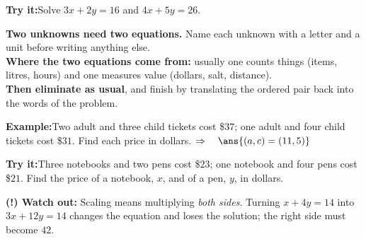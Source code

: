 \documentclass[12pt]{article}
\begin{document}
\begin{tryitbox}
\textbf{Try it:}\quad Solve $3x + 2y = 16$ and $4x + 5y = 26$.\\[2pt]
\end{tryitbox}


\begin{formulabox}
\textbf{Two unknowns need two equations.} Name each unknown with a letter and a
unit before writing anything else.\\[3pt]
\textbf{Where the two equations come from:} usually one counts things (items,
litres, hours) and one measures value (dollars, salt, distance).\\[3pt]
\textbf{Then eliminate as usual}, and finish by translating the ordered pair back
into the words of the problem.
\end{formulabox}

\begin{examplebox}
\textbf{Example:}\quad Two adult and three child tickets cost \$$37$; one adult
and four child tickets cost \$$31$. Find each price in dollars.
$\Rightarrow\quad \ans{(a, c) = (11, 5)}$
\end{examplebox}

\begin{tryitbox}
\textbf{Try it:}\quad Three notebooks and two pens cost \$$23$; one notebook and
four pens cost \$$21$. Find the price of a notebook, $x$, and of a pen, $y$, in
dollars.\\[2pt]
\end{tryitbox}

\begin{watchoutbox}
\textbf{(!) Watch out:} Scaling means multiplying \emph{both sides}. Turning
$x + 4y = 14$ into $3x + 12y = 14$ changes the equation and loses the solution;
the right side must become $42$.
\end{watchoutbox}
\end{document}
